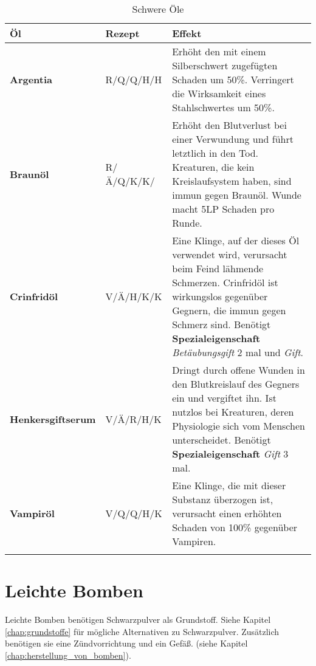 \begin{longtable}{|p{4cm}|p{}|p{9cm}|}
\hline
\textbf{Öl} & \textbf{Rezept} & \textbf{Effekt} \\ \hline

\textbf{Argentia} & R/Q/Q/H/H & Erhöht den mit einem Silberschwert zugefügten Schaden um 50\%. Verringert die Wirksamkeit eines Stahlschwertes um 50\%. \\ \hline

\textbf{Braunöl} & R/Ä/Q/K/K/ & Erhöht den Blutverlust bei einer Verwundung und führt letztlich in den Tod. Kreaturen, die kein Kreislaufsystem haben, sind immun gegen Braunöl. Wunde macht 5LP Schaden pro Runde. \\ \hline

\textbf{Crinfridöl} & V/Ä/H/K/K & Eine Klinge, auf der dieses Öl verwendet wird, verursacht beim Feind lähmende Schmerzen. Crinfridöl ist wirkungslos gegenüber Gegnern, die immun gegen Schmerz sind. Benötigt \textbf{Spezialeigenschaft} \textit{Betäubungsgift} 2 mal und \textit{Gift}. \\ \hline

\textbf{Henkersgiftserum} & V/Ä/R/H/K & Dringt durch offene Wunden in den Blutkreislauf des Gegners ein und vergiftet ihn. Ist nutzlos bei Kreaturen, deren Physiologie sich vom Menschen unterscheidet. Benötigt \textbf{Spezialeigenschaft} \textit{Gift} 3 mal. \\ \hline

\textbf{Vampiröl} & V/Q/Q/H/K & Eine Klinge, die mit dieser Substanz überzogen ist, verursacht einen erhöhten Schaden von 100\% gegenüber Vampiren.  \\ \hline

\caption{Schwere Öle}
\label{tab:schwere_oele}
\end{longtable}



\section{Leichte Bomben}
Leichte Bomben benötigen Schwarzpulver als Grundstoff. Siehe Kapitel \ref{chap:grundstoffe} für mögliche Alternativen zu Schwarzpulver. Zusätzlich benötigen sie eine Zündvorrichtung und ein Gefäß. (siehe Kapitel \ref{chap:herstellung_von_bomben}).

